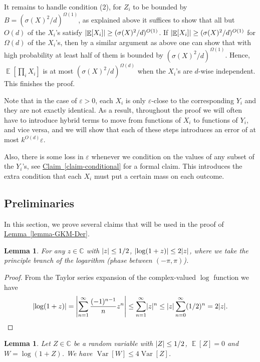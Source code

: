 \documentclass[11pt]{article}
\numberwithin{equation}{section}
\newtheorem{lemma}[theorem]{Lemma}
\theoremstyle{definition}
\theoremstyle{plain}
\newcommand{\C}{\mathbb C}
\newcommand{\expref}[2]{\hyperref[#2]{#1~\ref{#2}}}
\def\eps{\varepsilon}
\DeclarePairedDelimiter{\abs}{\lvert}{\rvert}
\DeclareMathOperator*{\E}{\mathbb{E}}                 %
\DeclareMathOperator*{\Var}{Var}                 %
\begin{document}
  It remains to handle condition (2), for $Z_i$ to be bounded by $B = (\sigma(X)^2/d)^{\Omega(1)}$, as explained above it suffices to show that all but $O(d)$ of the $X_i$'s satisfy $\abs{\E[X_i]} \ge (\sigma(X)^2/d)^{O(1)}$.
  If $\abs{\E[X_i]} \ge (\sigma(X)^2/d)^{O(1)}$ for $\Omega(d)$ of the $X_i$'s, then by a similar argument as above one can show that with high probability at least half of them is bounded by $(\sigma(X)^2/d)^{\Omega(1)}$.
  Hence, $\E[\prod_i X_i]$ is at most $(\sigma(X)^2/d)^{\Omega(d)}$ when the $X_i$'s are $d$-wise independent.
  This finishes the proof.

  Note that in the case of $\eps > 0$, each $X_i$ is only $\eps$-close to the corresponding $Y_i$ and they are not exactly identical.
  As a result, throughout the proof we will often have to introduce hybrid terms to move from functions of $X_i$ to functions of $Y_i$, and vice versa, and we will show that each of these steps introduces an error of at most $k^{O(d)} \eps$.

  Also, there is some loss in $\eps$ whenever we condition on the values of any subset of the $Y_i$'s, see \expref{Claim}{claim-conditional} for a formal claim.
  This introduces the extra condition that each $X_i$ must put a certain mass on each outcome.

  \subsection{Preliminaries}
  In this section, we prove several claims that will be used in the proof of \expref{Lemma}{lemma-GKM-Der}.

  \begin{lemma} \label{lemma-norm-log-of-z}
    For any $z \in \C$ with $\abs{z} \le 1/2$, $\abs{\log(1 + z)} \le 2\abs{z}$, where we take the principle branch of the logarithm (phase between $(-\pi, \pi)$).
  \end{lemma}
  \begin{proof}
    {}From the Taylor series expansion of the complex-valued $\log$ function we have
    \[
      \abs{\log(1 + z)} = \abs*{ \sum_{n = 1}^\infty \frac{(-1)^{n - 1}}{n} z^n } \le \sum_{n = 1}^\infty \abs{z}^n \le \abs{z} \sum_{n = 0}^\infty (1/2)^n = 2 \abs{z} . \qedhere
    \]
  \end{proof}

  \begin{lemma} \label{lemma-var-of-log}
    Let $Z \in \C$ be a random variable with $\abs{Z} \le 1/2$, $\E[Z] = 0$ and $W = \log(1 + Z)$.
    We have $\Var[W] \le 4 \Var[Z]$.
  \end{lemma}
\end{document}
